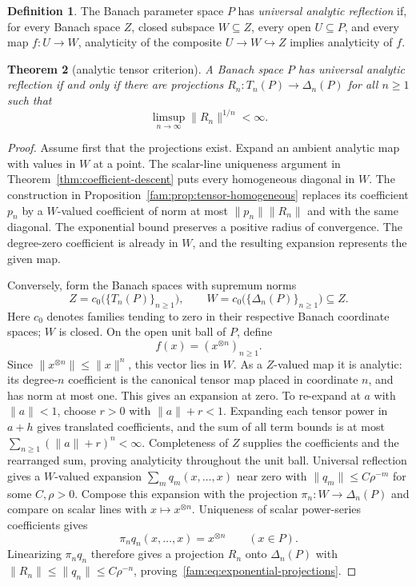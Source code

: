 \documentclass[11pt]{amsart}
\newtheorem{theorem}{Theorem}[section]
\theoremstyle{definition}
\newtheorem{definition}[theorem]{Definition}
\theoremstyle{remark}
\numberwithin{equation}{section}
\newcommand{\norm}[1]{\lVert #1\rVert}
\begin{document}
\begin{definition}\label{fam:def:universal-reflection}
The Banach parameter space $P$ has \emph{universal analytic reflection} if, for every Banach space $Z$, closed
subspace $W\subseteq Z$, every open $U\subseteq P$, and every map $f\colon U\to W$, analyticity of
the composite $U\to W\hookrightarrow Z$ implies analyticity of $f$.
\end{definition}

\begin{theorem}[analytic tensor criterion]\label{fam:thm:tensor-analytic}
A Banach space $P$ has universal analytic reflection if and only if there are projections
$R_n\colon T_n(P)\to\Delta_n(P)$ for all $n\ge1$ such that
\begin{equation}\label{fam:eq:exponential-projections}
 \limsup_{n\to\infty}\norm{R_n}^{1/n}<\infty.
\end{equation}
\end{theorem}

\begin{proof}
Assume first that the projections exist. Expand an ambient analytic map with values in $W$ at a point.
The scalar-line uniqueness argument in Theorem~\ref{thm:coefficient-descent} puts every homogeneous diagonal in $W$.
The construction in Proposition~\ref{fam:prop:tensor-homogeneous} replaces its coefficient $p_n$ by a
$W$\nobreakdash-valued coefficient of norm at most $\norm{p_n}\norm{R_n}$ and with the same diagonal.
The exponential bound preserves a positive radius of convergence. The degree-zero coefficient is
already in $W$, and the resulting expansion represents the given map.

Conversely, form the Banach spaces with supremum norms
\[
 Z=c_0\bigl(\{T_n(P)\}_{n\ge1}\bigr),\qquad
 W=c_0\bigl(\{\Delta_n(P)\}_{n\ge1}\bigr)\subseteq Z.
\]
Here $c_0$ denotes families tending to zero in their respective Banach coordinate spaces; $W$ is closed.
On the open unit ball of $P$, define
\[
 f(x)=(x^{\otimes n})_{n\ge1}.
\]
Since $\norm{x^{\otimes n}}\le\norm x^n$, this vector lies in $W$.
As a $Z$\nobreakdash-valued map it is analytic: its degree-$n$ coefficient is the canonical tensor map
placed in coordinate $n$, and has norm at most one. This gives an expansion at zero. To re-expand
at $a$ with $\norm a<1$, choose $r>0$ with $\norm a+r<1$. Expanding each tensor power in $a+h$
gives translated coefficients, and the sum of all term bounds is at most
$\sum_{n\ge1}(\norm a+r)^n<\infty$. Completeness of $Z$ supplies the coefficients and the
rearranged sum, proving analyticity throughout the unit ball. Universal reflection gives a $W$\nobreakdash-valued
expansion $\sum_mq_m(x,\ldots,x)$ near zero with $\norm{q_m}\le C\rho^{-m}$ for some $C,\rho>0$.
Compose this expansion with the projection $\pi_n\colon W\to\Delta_n(P)$ and compare on scalar lines
with $x\mapsto x^{\otimes n}$. Uniqueness of scalar power-series coefficients gives
\[
 \pi_nq_n(x,\ldots,x)=x^{\otimes n}\qquad(x\in P).
\]
Linearizing $\pi_nq_n$ therefore gives a projection $R_n$ onto $\Delta_n(P)$ with
$\norm{R_n}\le\norm{q_n}\le C\rho^{-n}$, proving~\eqref{fam:eq:exponential-projections}.
\end{proof}
\end{document}
